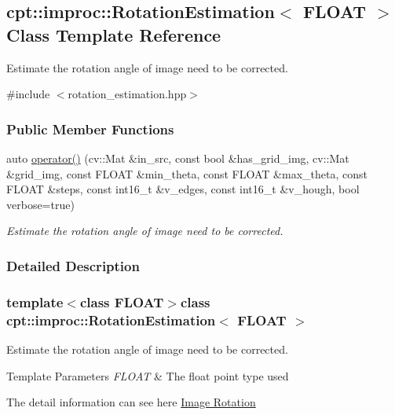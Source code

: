 \hypertarget{classcpt_1_1improc_1_1_rotation_estimation}{\subsection{cpt\-:\-:improc\-:\-:Rotation\-Estimation$<$ F\-L\-O\-A\-T $>$ Class Template Reference}
\label{classcpt_1_1improc_1_1_rotation_estimation}
}


Estimate the rotation angle of image need to be corrected.  




{\ttfamily \#include $<$rotation\-\_\-estimation.\-hpp$>$}

\subsubsection*{Public Member Functions}
\begin{DoxyCompactItemize}
\item 
auto \hyperlink{classcpt_1_1improc_1_1_rotation_estimation_ad90f0e3d503faf80c73bd671429af006}{operator()} (cv\-::\-Mat \&in\-\_\-src, const bool \&has\-\_\-grid\-\_\-img, cv\-::\-Mat \&grid\-\_\-img, const F\-L\-O\-A\-T \&min\-\_\-theta, const F\-L\-O\-A\-T \&max\-\_\-theta, const F\-L\-O\-A\-T \&steps, const int16\-\_\-t \&v\-\_\-edges, const int16\-\_\-t \&v\-\_\-hough, bool verbose=true)
\begin{DoxyCompactList}\small\item\em Estimate the rotation angle of image need to be corrected. \end{DoxyCompactList}\end{DoxyCompactItemize}


\subsubsection{Detailed Description}
\subsubsection*{template$<$class F\-L\-O\-A\-T$>$class cpt\-::improc\-::\-Rotation\-Estimation$<$ F\-L\-O\-A\-T $>$}

Estimate the rotation angle of image need to be corrected. 


\begin{DoxyTemplParams}{Template Parameters}
{\em F\-L\-O\-A\-T} & The float point type used\\
\hline
\end{DoxyTemplParams}
The detail information can see here \hyperlink{improc_image_rotation}{Image Rotation} 

